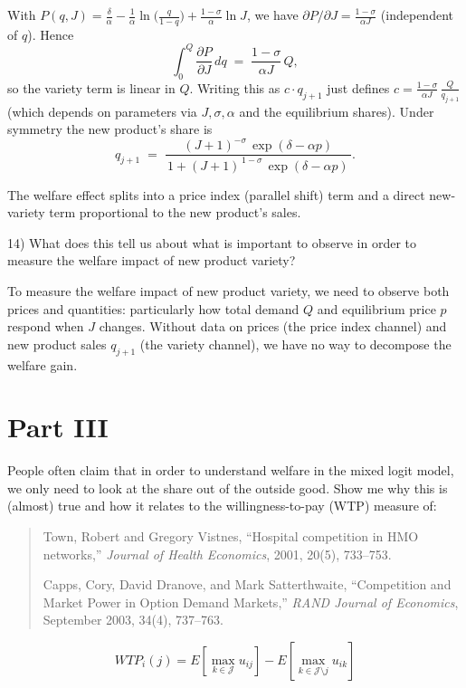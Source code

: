 \documentclass{article}
\begin{document}
With
\(
P(q,J)=\frac{\delta}{\alpha}-\frac{1}{\alpha}\ln\!\big(\frac{q}{1-q}\big)+\frac{1-\sigma}{\alpha}\ln J
\),
we have \(\partial P/\partial J=\frac{1-\sigma}{\alpha J}\) (independent of \(q\)). Hence
\[
\int_{0}^{Q}\frac{\partial P}{\partial J}\,dq \;=\; \frac{1-\sigma}{\alpha J}\,Q,
\]
so the variety term is linear in \(Q\). Writing this as \(c\cdot q_{j+1}\) just defines
\(
c=\frac{1-\sigma}{\alpha J}\,\frac{Q}{q_{j+1}}
\)
(which depends on parameters via \(J,\sigma,\alpha\) and the equilibrium shares).
Under symmetry the new product’s share is
\[
q_{j+1} \;=\; \frac{(J{+}1)^{-\sigma}\,\exp(\delta-\alpha p)}{\,1+(J{+}1)^{\,1-\sigma}\,\exp(\delta-\alpha p)\,}.
\]

The welfare effect splits into a price index (parallel shift) term and a direct new-variety term proportional to the
new product’s sales.


\begin{tcolorbox}
14) What does this tell us about what is important to observe in order to measure the welfare impact of new product variety?
\end{tcolorbox}

To measure the welfare impact of new product variety, we need to observe both prices and quantities: particularly how total demand $Q$ and equilibrium price $p$ respond when $J$ changes. Without data on prices (the price index channel) and new product sales $q_{j+1}$ (the variety channel), we have no way to decompose the welfare gain.


\section*{Part III}

\begin{tcolorbox}
People often claim that in order to understand welfare in the mixed logit model, we only need to look at the share out of the outside good. Show me why this is (almost) true and how it relates to the willingness-to-pay (WTP) measure of:

\begin{quote}
Town, Robert and Gregory Vistnes, ``Hospital competition in HMO networks,'' \emph{Journal of Health Economics}, 2001, 20(5), 733--753.

Capps, Cory, David Dranove, and Mark Satterthwaite, ``Competition and Market Power in Option Demand Markets,'' \emph{RAND Journal of Economics}, September 2003, 34(4), 737--763.
\end{quote}

\[
WTP_i(j) = E[ \max_{k \in \mathcal{J}} u_{ij}] - E[ \max_{k \in \mathcal{J} \setminus j} u_{ik}]
\]
\end{tcolorbox}
\end{document}
